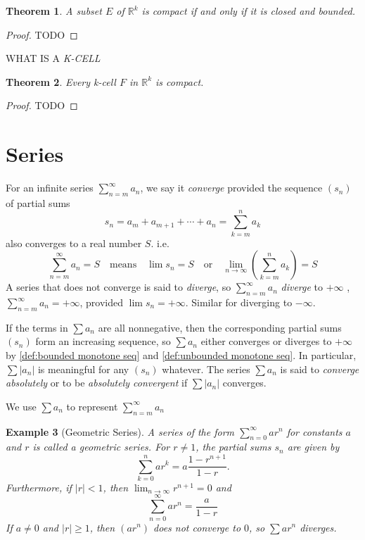 \documentclass[12pt, lettersize]{book}
\newtheorem{thm}{Theorem}[section]
\newtheorem{eg}[thm]{Example}
\begin{document}
		\begin{thm}
		A subset $E$ of $\mathbb{R}^k$ is compact if and only if it is closed and bounded.
		\end{thm}
		\begin{proof}
		TODO
		\end{proof}
	
		WHAT IS A \emph{K-CELL}
		
		\begin{thm}
		Every k-cell $F$ in $\mathbb{R}^k$ is compact.
		\end{thm}
		\begin{proof}
		TODO
		\end{proof}
		\newpage
	\section{Series}
		For an infinite series $\sum_{n=m}^{\infty}a_n$, we say it \emph{converge} provided the sequence $(s_n)$ of 
		partial sums
		\begin{displaymath}
			s_n=a_m+a_{m+1}+\cdots+a_n=\sum_{k=m}^{n}a_k
		\end{displaymath}
		also converges to a real number $S$. i.e.
		\begin{displaymath}
			\sum_{n=m}^{\infty}a_n=S\quad\text{means}\quad\lim s_n=S\quad\text{or}\quad\lim\limits_{n\rightarrow\infty}\left(\sum_{k=m}^{n}a_k\right)=S
		\end{displaymath}
		A series that does not converge is said to \emph{diverge}, so $\sum_{n=m}^{\infty}a_n$ \emph{diverge} to $+\infty$
		, $\sum_{n=m}^{\infty}a_n=+\infty$, provided $\lim s_n=+\infty$. Similar for diverging to $-\infty$.
		
		If the terms in $\sum a_n$ are all nonnegative, then the corresponding partial sums $(s_n)$ form an increasing sequence, so $\sum a_n$ either converges or diverges to $+\infty$ by \ref{def:bounded monotone seq} and \ref{def:unbounded monotone seq}. In particular, $\sum |a_n|$ is meaningful for any $(s_n)$ whatever. The series
		$\sum a_n$ is said to \emph{converge absolutely} or to be \emph{absolutely convergent} if $\sum |a_n|$ converges.
		
		We use $\sum a_n$ to represent $\sum_{n=m}^{\infty}a_n$
		
		\begin{eg}[Geometric Series]
		A series of the form $\sum_{n=0}^{\infty}ar^n$ for constants $a$ and $r$ is called a geometric series. For $r\neq1$,
		the partial sums $s_n$ are given by
		\begin{displaymath}
			\sum_{k=0}^{n}ar^k=a\frac{1-r^{n+1}}{1-r}.
		\end{displaymath}
		Furthermore, if $|r|<1$, then $\lim_{n\rightarrow \infty}r^{n+1}=0$ and
		\begin{displaymath}
			\sum_{n=0}^{\infty}ar^n=\frac{a}{1-r}
		\end{displaymath}
		If $a\neq0$ and $|r|\geq1$, then $(ar^n)$ does not converge to $0$, so $\sum ar^n$ diverges.
		\end{eg}
		
\end{document}
